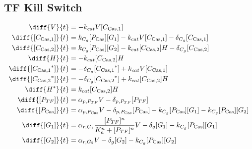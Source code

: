 \subsection{TF Kill Switch}
\label{s:TF_delayed_kill_switch}

\begin{align}
\diff{\vectorGen{}}{t} & = - \casCutRate{{}}\vectorGen{}\conc{\cplx{\cas}{1}}\\ 
\diff{\conc{\cplx{\cas}{1}}}{t} & =  \gRnaBind{}\conc{\proSp{\cas{}}}\conc{\gRna{1}} - \casCutRate{{}}\vectorGen{}\conc{\cplx{\cas}{1}} - \casCompDegradeRate{}\conc{\cplx{\cas}{1}}\\ 
\diff{\conc{\cplx{\cas}{2}}}{t} & =  \gRnaBind{}\conc{\proSp{\cas{}}}\conc{\gRna{2}} - \casCutRate{{}}\conc{\cplx{\cas}{2}}\hostGen{} - \casCompDegradeRate{}\conc{\cplx{\cas}{2}}\\ 
\diff{\hostGen{}}{t} & = - \casCutRate{{}}\conc{\cplx{\cas}{2}}\hostGen{}\\ 
\diff{\conc{\bound{\cplx{\cas}{1}}}}{t} & = - \casCompDegradeRate{}\conc{\bound{\cplx{\cas}{1}}} + \casCutRate{{}}\vectorGen{}\conc{\cplx{\cas}{1}}\\ 
\diff{\conc{\bound{\cplx{\cas}{2}}}}{t} & = - \casCompDegradeRate{}\conc{\bound{\cplx{\cas}{2}}} + \casCutRate{{}}\conc{\cplx{\cas}{2}}\hostGen{}\\ 
\diff{\edited{\hostGen{}}}{t} & =  \casCutRate{{}}\conc{\cplx{\cas}{2}}\hostGen{}\\ 
\diff{\conc{\proSp{TF}}}{t} & =  \txtlRate{\proSp{TF}}\vectorGen{} - \proDegradeRate{\proSp{TF}}\conc{\proSp{TF}}\\ 
\diff{\conc{\proSp{\cas{}}}}{t} & =  \txtlRate{\proSp{\cas{}}}\vectorGen{} - \proDegradeRate{\proSp{\cas{}}}\conc{\proSp{\cas{}}} - \gRnaBind{}\conc{\proSp{\cas{}}}\conc{\gRna{1}} - \gRnaBind{}\conc{\proSp{\cas{}}}\conc{\gRna{2}}\\ 
\diff{\conc{\gRna{1}}}{t} & =  \txRate{\gRna{1}}\frac{[\proSp{TF}]^n}{K_a^n + [\proSp{TF}]^n}\vectorGen{} - \rnaDegradeRate{}\conc{\gRna{1}} - \gRnaBind{}\conc{\proSp{\cas{}}}\conc{\gRna{1}}\\ 
\diff{\conc{\gRna{2}}}{t} & =  \txRate{\gRna{2}}\vectorGen{} - \rnaDegradeRate{}\conc{\gRna{2}} - \gRnaBind{}\conc{\proSp{\cas{}}}\conc{\gRna{2}}
\end{align}

